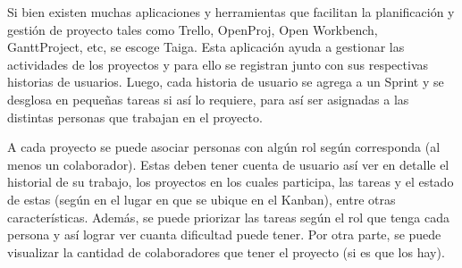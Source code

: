 Si bien existen muchas aplicaciones y herramientas que facilitan la planificación y gestión de proyecto tales como Trello, OpenProj, Open Workbench, GanttProject, etc, se escoge Taiga. Esta aplicación ayuda a gestionar las actividades de los proyectos y para ello se registran junto con sus respectivas historias de usuarios. Luego, cada historia de usuario se agrega a un Sprint y se desglosa en pequeñas tareas si así lo requiere, para así ser asignadas a las distintas personas que trabajan en el proyecto.

A cada proyecto se puede asociar personas con algún rol según corresponda (al menos un colaborador). Estas deben tener cuenta de usuario así ver en detalle el historial de su trabajo, los proyectos en los cuales participa, las tareas y el estado de estas (según en el lugar en que se ubique en el Kanban), entre otras características. Además, se puede priorizar las tareas según el rol que tenga cada persona y así lograr ver cuanta dificultad puede tener. Por otra parte, se puede visualizar la cantidad de colaboradores que tener el proyecto (si es que los hay).
